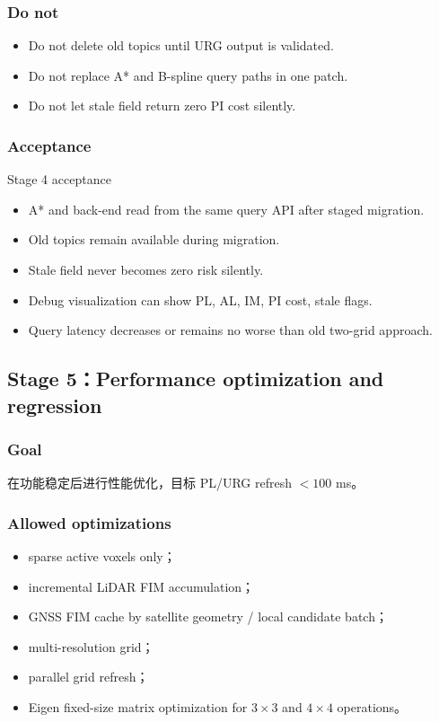 \documentclass[11pt,a4paper]{article}
\begin{document}
\subsubsection{Do not}
\begin{itemize}
\item Do not delete old topics until URG output is validated.
\item Do not replace A* and B-spline query paths in one patch.
\item Do not let stale field return zero PI cost silently.
\end{itemize}

\subsubsection{Acceptance}
\begin{acceptbox}{Stage 4 acceptance}
\begin{itemize}
  \item A* and back-end read from the same query API after staged migration.
  \item Old topics remain available during migration.
  \item Stale field never becomes zero risk silently.
  \item Debug visualization can show PL, AL, IM, PI cost, stale flags.
  \item Query latency decreases or remains no worse than old two-grid approach.
\end{itemize}
\end{acceptbox}

\subsection{Stage 5：Performance optimization and regression}

\subsubsection{Goal}
在功能稳定后进行性能优化，目标 PL/URG refresh $<100$ ms。

\subsubsection{Allowed optimizations}
\begin{itemize}
\item sparse active voxels only；
\item incremental LiDAR FIM accumulation；
\item GNSS FIM cache by satellite geometry / local candidate batch；
\item multi-resolution grid；
\item parallel grid refresh；
\item Eigen fixed-size matrix optimization for $3\times3$ and $4\times4$ operations。
\end{itemize}
\end{document}
